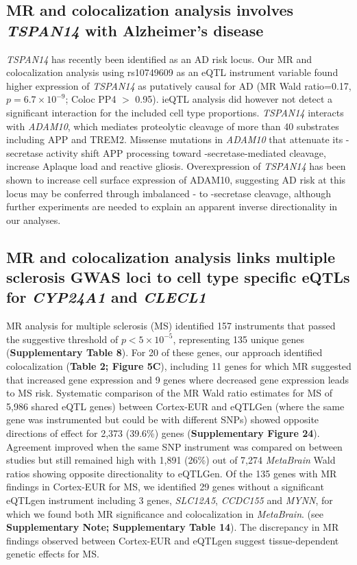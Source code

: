 \subsection{MR and colocalization analysis involves \emph{TSPAN14} with Alzheimer’s disease }

\emph{TSPAN14} has recently been identified as an AD risk locus\cite{schwartzentruberGenomewideMetaanalysisFinemapping2020}. Our MR and colocalization analysis using rs10749609 as an eQTL instrument variable found higher expression of \emph{TSPAN14} as putatively causal for AD (MR Wald ratio=0.17, $p=6.7 \times 10^{-9}$; Coloc PP4 $>$ 0.95). ieQTL analysis did however not detect a significant interaction for the included cell type proportions. \emph{TSPAN14} interacts with \emph{ADAM10}​, which mediates proteolytic cleavage of more than 40 substrates including APP and TREM2\cite{matthewsRegulationLeukocytesTspanC82018}. Missense mutations in \emph{ADAM10} that attenuate its \alpha-secretase activity shift APP processing toward \beta-secretase-mediated cleavage, increase A\beta plaque load and reactive gliosis\cite{suhADAM10MissenseMutations2013}. Overexpression of \emph{TSPAN14} has been shown to increase cell surface expression of ADAM10\cite{jouannetTspanC8TetraspaninsDifferentially2016}, suggesting AD risk at this locus may be conferred through imbalanced \alpha- to \beta-secretase cleavage, although further experiments are needed to explain an apparent inverse directionality in our analyses. 

\subsection{MR and colocalization analysis links multiple sclerosis GWAS loci to cell type specific eQTLs for \emph{CYP24A1} and \emph{CLECL1}}
MR analysis for multiple sclerosis (MS) identified 157 instruments that passed the suggestive threshold of $p<5 \times 10^{-5}$, representing 135 unique genes (\textbf{Supplementary Table 8}). For 20 of these genes, our approach identified colocalization (\textbf{Table 2; Figure 5C}), including 11 genes for which MR suggested that increased gene expression and 9 genes where decreased gene expression leads to MS risk. Systematic comparison of the MR Wald ratio estimates for MS of 5,986 shared eQTL genes) between Cortex-EUR and eQTLGen (where the same gene was instrumented but could be with different SNPs)\cite{vosaUnravelingPolygenicArchitecture2018} showed opposite directions of effect for 2,373 (39.6\%) genes (\textbf{Supplementary Figure 24}).  Agreement improved when the same SNP instrument was compared on between studies but still remained high with 1,891 (26\%) out of 7,274 \emph{MetaBrain} Wald ratios showing opposite directionality to eQTLGen. Of the 135 genes with MR findings in Cortex-EUR for MS, we identified 29 genes without a significant eQTLgen instrument including 3 genes, \emph{SLC12A5}, \emph{CCDC155} and \emph{MYNN}, for which we found both MR significance and colocalization in \emph{MetaBrain}. (see \textbf{Supplementary Note; Supplementary Table 14}). The discrepancy in MR findings observed between Cortex-EUR and eQTLgen suggest tissue-dependent genetic effects for MS. 

